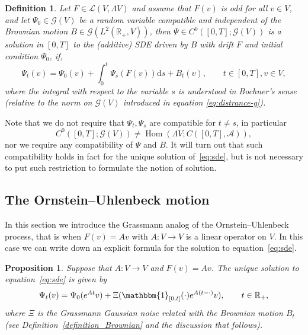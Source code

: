 \documentclass{article}
\newcommand{\mathd}{\mathrm{d}}
\newcommand{\tmop}[1]{\ensuremath{\operatorname{#1}}}
\newtheorem{definition}[theorem]{Definition}
\newtheorem{proposition}[theorem]{Proposition}
{\theorembodyfont{\rmfamily}\newtheorem{remark}[theorem]{Remark}}
\begin{document}
\begin{definition}
  Let $F \in \mathcal{L} (V, \Lambda V)$ and assume that $F (v)$ is odd for
  all $v \in V$, and let $\Psi_0 \in \mathcal{G} (V)$ be a random variable
  compatible and independent of the Brownian motion $B \in \mathcal{G} (L^2
  (\mathbb{R}_+, V))$, then $\Psi \in C^0 ([0, T] ; \mathcal{G} (V))$ is a
  solution in $[0, T]$ to the (additive) SDE driven by $B$ with drift $F$ and
  initial condition $\Psi_0$, if,
  \begin{equation}
    \Psi_t (v) = \Psi_0 (v) + \int_0^t \Psi_s (F (v)) \mathd s + B_t (v),
    \qquad t \in [0, T], v \in V, \label{eq:sde}
  \end{equation}
  where the integral with respect to the variable $s$ is understood in
  Bochner's sense (relative to the norm on $\mathcal{G} (V)$ introduced in
  equation {\eqref{eq:distrance-g}}).
\end{definition}

\begin{remark}
  Note that we do not require that $\Psi_t, \Psi_s$ are compatible for $t \neq
  s$, in particular
  \[ C^0 ([0, T] ; \mathcal{G} (V)) \neq \tmop{Hom} (\Lambda V ; C ([0, T],
     \mathcal{A})), \]
  nor we require any compatibility of $\Psi$ and $B$. It will turn out that
  such compatibility holds in fact for the unique solution
  of~{\eqref{eq:sde}}, but is not necessary to put such restriction to
  formulate the notion of solution.
\end{remark}

\subsection{The Ornstein--Uhlenbeck motion}

In this section we introduce the Grassmann analog of the Ornstein--Uhlenbeck
process, that is when $F (v) = A v$ with $A : V \rightarrow V$ is a linear
operator on $V$. In this case we can write down an explicit formula for the
solution to equation~{\eqref{eq:sde}}.

\begin{proposition}
  \label{proposition_linear}Suppose that $A : V \rightarrow V$ and $F (v) = A
  v$. The unique solution to equation~{\eqref{eq:sde}} is given by
  \begin{equation}
    \Psi_t (v) = \Psi_0 (e^{A t} v) + \Xi (\mathbbm{1}_{[0, t]} (\cdot) e^{A (t
    - \cdot)} v), \qquad t \in \mathbb{R}_+, \label{eq:linear}
  \end{equation}
  where $\Xi$ is the Grassmann Gaussian noise related with the Brownian motion
  $B_t$ (see Definition~\ref{definition_Brownian} and the discussion that
  follows).
\end{proposition}
\end{document}
